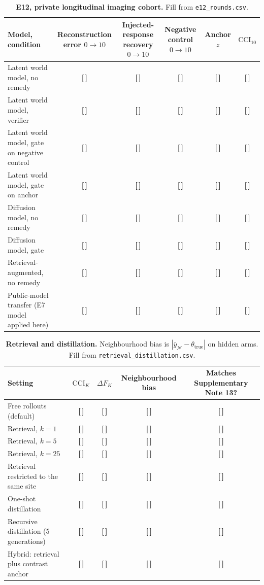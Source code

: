 \documentclass[11pt,a4paper]{article}
\newcommand{\T}{{\color{red}\textbf{[\,]}}}
\newcommand{\CCI}{\mathrm{CCI}}
\begin{document}
\FloatBarrier
\begin{table}[!htbp]\centering\footnotesize
\caption{\textbf{E12, private longitudinal imaging cohort.} Fill from \texttt{e12\_rounds.csv}.}
\label{tab:s37}
\begin{tabularx}{\textwidth}{@{}p{3.9cm} C C C C C@{}}\toprule
Model, condition & Reconstruction error $0\to10$ & Injected-response recovery $0\to10$ & Negative control $0\to10$ & Anchor $z$ & $\CCI_{10}$\\\midrule
Latent world model, no remedy & \T & \T & \T & \T & \T\\
Latent world model, verifier & \T & \T & \T & \T & \T\\
Latent world model, gate on negative control & \T & \T & \T & \T & \T\\
Latent world model, gate on anchor & \T & \T & \T & \T & \T\\
Diffusion model, no remedy & \T & \T & \T & \T & \T\\
Diffusion model, gate & \T & \T & \T & \T & \T\\
Retrieval-augmented, no remedy & \T & \T & \T & \T & \T\\
Public-model transfer (E7 model applied here) & \T & \T & \T & \T & \T\\
\bottomrule\end{tabularx}
\end{table}
\FloatBarrier
\begin{table}[!htbp]\centering\footnotesize
\caption{\textbf{Retrieval and distillation.} Neighbourhood bias is $|\bar y_{\mathcal N}-\theta_{\mathrm{true}}|$ on hidden arms. Fill from \texttt{retrieval\_distillation.csv}.}
\label{tab:s38}
\begin{tabularx}{\textwidth}{@{}p{3.9cm} C C C C@{}}\toprule
Setting & $\CCI_K$ & $\Delta F_K$ & Neighbourhood bias & Matches Supplementary Note 13?\\\midrule
Free rollouts (default) & \T & \T & \T & \T\\
Retrieval, $k=1$ & \T & \T & \T & \T\\
Retrieval, $k=5$ & \T & \T & \T & \T\\
Retrieval, $k=25$ & \T & \T & \T & \T\\
Retrieval restricted to the same site & \T & \T & \T & \T\\
One-shot distillation & \T & \T & \T & \T\\
Recursive distillation (5 generations) & \T & \T & \T & \T\\
Hybrid: retrieval plus contrast anchor & \T & \T & \T & \T\\
\bottomrule\end{tabularx}
\end{table}
\end{document}

